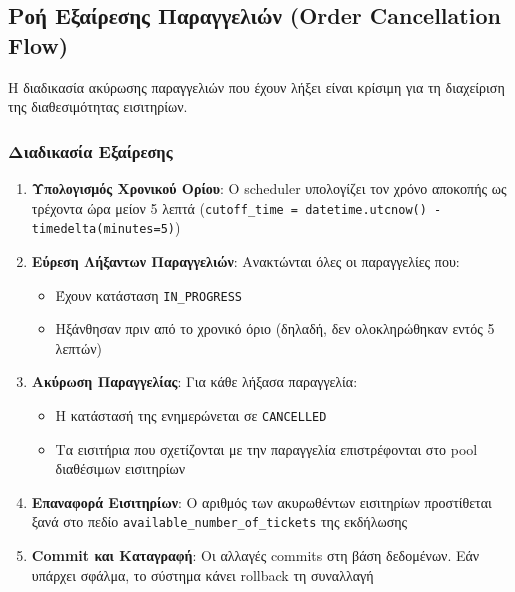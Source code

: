 \documentclass[12pt,a4paper]{report}
\begin{document}
\subsection{Ροή Εξαίρεσης Παραγγελιών (Order Cancellation Flow)}

Η διαδικασία ακύρωσης παραγγελιών που έχουν λήξει είναι κρίσιμη για τη διαχείριση της διαθεσιμότητας εισιτηρίων.

\subsubsection{Διαδικασία Εξαίρεσης}

\begin{enumerate}
    \item \textbf{Υπολογισμός Χρονικού Ορίου}: Ο scheduler υπολογίζει τον χρόνο αποκοπής ως τρέχοντα ώρα μείον 5 λεπτά (\texttt{cutoff\_time = datetime.utcnow() - timedelta(minutes=5)})
    
    \item \textbf{Εύρεση Λήξαντων Παραγγελιών}: Ανακτώνται όλες οι παραγγελίες που:
    \begin{itemize}
        \item Έχουν κατάσταση \texttt{IN\_PROGRESS}
        \item Ηξάνθησαν πριν από το χρονικό όριο (δηλαδή, δεν ολοκληρώθηκαν εντός 5 λεπτών)
    \end{itemize}
    
    \item \textbf{Ακύρωση Παραγγελίας}: Για κάθε λήξασα παραγγελία:
    \begin{itemize}
        \item Η κατάστασή της ενημερώνεται σε \texttt{CANCELLED}
        \item Τα εισιτήρια που σχετίζονται με την παραγγελία επιστρέφονται στο pool διαθέσιμων εισιτηρίων
    \end{itemize}
    
    \item \textbf{Επαναφορά Εισιτηρίων}: Ο αριθμός των ακυρωθέντων εισιτηρίων προστίθεται ξανά στο πεδίο \texttt{available\_number\_of\_tickets} της εκδήλωσης
    
    \item \textbf{Commit και Καταγραφή}: Οι αλλαγές commits στη βάση δεδομένων. Εάν υπάρχει σφάλμα, το σύστημα κάνει rollback τη συναλλαγή
\end{enumerate}
\end{document}

